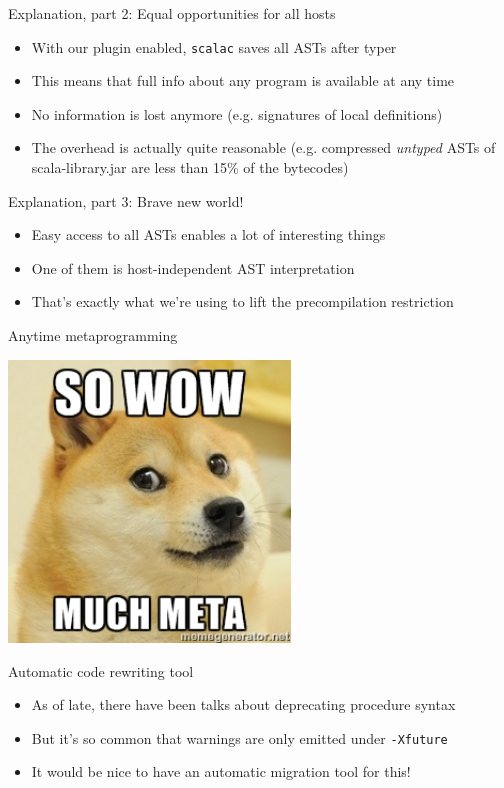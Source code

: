 \documentclass[svgnames,dvipsnames,hyperref={bookmarks=false},usepdftitle=false]{beamer}
\begin{document}
\begin{frame}{Explanation, part 2: Equal opportunities for all hosts}
\begin{itemize}
\item With our plugin enabled, \texttt{scalac} saves all ASTs after typer
\item This means that full info about any program is available at any time
\item No information is lost anymore (e.g. signatures of local definitions)
\item The overhead is actually quite reasonable (e.g. compressed \emph{untyped} ASTs of scala-library.jar are less than 15\% of the bytecodes)
\end{itemize}
\end{frame}

\begin{frame}{Explanation, part 3: Brave new world!}
\begin{itemize}
\item Easy access to all ASTs enables a lot of interesting things
\item One of them is host-independent AST interpretation
\item That's exactly what we're using to lift the precompilation restriction
\end{itemize}
\end{frame}

\begin{frame}[c, fragile]{Anytime metaprogramming}
\begin{center}
\includegraphics[height=7.5cm]{much-meta.jpg}
\end{center}
\end{frame}

\begin{frame}{Automatic code rewriting tool}
\begin{itemize}
\item As of late, there have been talks about deprecating procedure syntax
\item But it's so common that warnings are only emitted under \texttt{-Xfuture}
\item It would be nice to have an automatic migration tool for this!
\end{itemize}
\end{frame}
\end{document}
